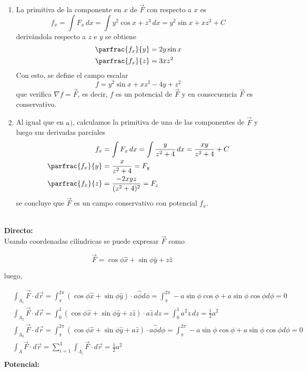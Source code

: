 \begin{enumerate}[label=\alph*)]
    \item La primitiva de la componente en $x$ de $\Vec{F}$ con respecto a $x$ es
    \[f_x=\int F_x\,dx=\int y^2\cos{x}+z^3\,dx=y^2\sin{x}+xz^3+C\]
    derivándola respecto a $z$ e $y$ se obtiene
    \begin{equation}
    \begin{split}
        \parfrac{f_x}{y} &= 2y\sin{x}\\
        \parfrac{f_x}{z} &= 3xz^2\\
    \end{split}
    \nonumber
    \end{equation}
    Con esto, se define el campo escalar
    \[f=y^2\sin{x}+xz^3-4y+z^2\]
    que verifica $\nabla f=\Vec{F}$, es decir, $f$ es un potencial de $\Vec{F}$ y en consecuencia $\Vec{F}$ es conservativo.
    \item Al igual que en $a)$, calculamos la primitiva de una de las componentes de $\Vec{F}$ y luego sus derivadas parciales
    \begin{equation}
    \begin{split}
        f_x&=\int F_x\,dx=\int \frac{y}{z^2+4}\,dx=\frac{xy}{z^2+4}+C\\
        \parfrac{f_x}{y} &= \frac{x}{z^2+4}=F_y\\
        \parfrac{f_x}{z} &= \frac{-2xyz}{(z^2+4)^2}=F_z\\
    \end{split}
    \nonumber
    \end{equation}
    se concluye que $\Vec{F}$ es un campo conservativo con potencial $f_x$.
\end{enumerate}
\bigbreak
{}\\

\textbf{Directo:}\\

Usando coordenadas cilíndricas se puede expresar $\Vec{F}$ como

\[\Vec{F}=\cos{\phi}\hat{x}+\sin{\phi}\hat{y}+z\hat{z}\]

luego,

\begin{equation}
\begin{split}
    &\int_{\Lambda_1}\Vec{F}\cdot d\Vec{r}=\int^{2\pi}_\pi (\cos{\phi}\hat{x}+\sin{\phi}\hat{y})\cdot a\hat{\phi}d\phi=\int^{2\pi}_\pi -a\sin{\phi}\cos{\phi}+a\sin{\phi}\cos{\phi}d\phi=0\\
    &\int_{\Lambda_2}\Vec{F}\cdot d\Vec{r}=\int^1_0 (\cos{\phi}\hat{x}+\sin{\phi}\hat{y}+z\hat{z})\cdot a\hat{z}\,dz=\int^1_0a^2z\,dz=\frac{1}{2}a^2\\
    &\int_{\Lambda_3}\Vec{F}\cdot d\Vec{r}=\int^{2\pi}_\pi (\cos{\phi}\hat{x}+\sin{\phi}\hat{y}+a\hat{z})\cdot a\hat{\phi}d\phi=\int^{2\pi}_\pi -a\sin{\phi}\cos{\phi}+a\sin{\phi}\cos{\phi}d\phi=0\\
    &\int_\Lambda \Vec{F}\cdot d\Vec{r}=\sum^3_{i=1}\int_{\Lambda_i}\Vec{F}\cdot d\Vec{r}=\frac{1}{2}a^2\\
\end{split}
\nonumber
\end{equation}
\bigbreak
\textbf{Potencial:}\\

